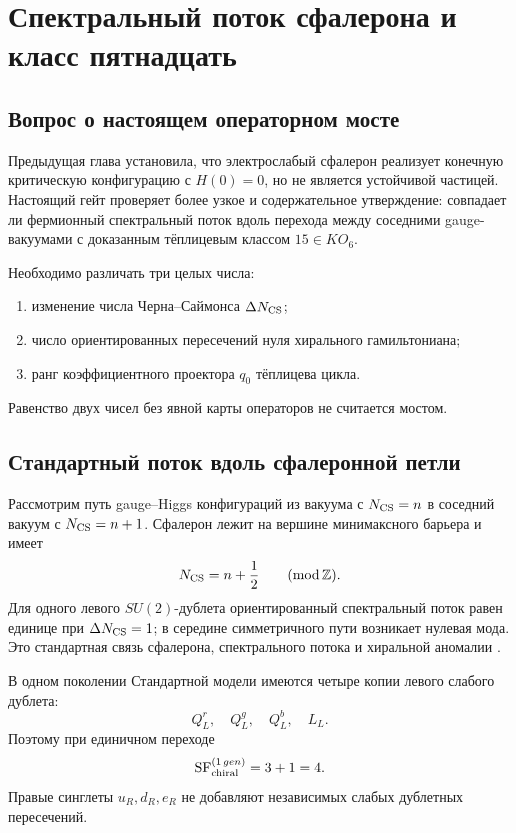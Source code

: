 \chapter{Спектральный поток сфалерона и класс пятнадцать}
\label{ch:v6-spectral-transition-sphaleron-spectral-flow-gate}

\section{Вопрос о настоящем операторном мосте}

Предыдущая глава установила, что электрослабый сфалерон реализует
конечную критическую конфигурацию с $H(0)=0$, но не является устойчивой
частицей. Настоящий гейт проверяет более узкое и содержательное
утверждение: совпадает ли фермионный спектральный поток вдоль перехода
между соседними gauge-вакуумами с доказанным тёплицевым классом
$15\in KO_6$.

Необходимо различать три целых числа:
\begin{enumerate}
 \item изменение числа Черна--Саймонса $\Delta N_{\rm CS}$;
 \item число ориентированных пересечений нуля хирального гамильтониана;
 \item ранг коэффициентного проектора $q_0$ тёплицева цикла.
\end{enumerate}
Равенство двух чисел без явной карты операторов не считается мостом.

\section{Стандартный поток вдоль сфалеронной петли}

Рассмотрим путь gauge--Higgs конфигураций из вакуума с
$N_{\rm CS}=n$ в соседний вакуум с $N_{\rm CS}=n+1$. Сфалерон лежит на
вершине минимаксного барьера и имеет
\begin{equation}
 N_{\rm CS}=n+\frac12
 \qquad (\operatorname{mod}\mathbb Z).
\end{equation}
Для одного левого $SU(2)$-дублета ориентированный спектральный поток
равен единице при $\Delta N_{\rm CS}=1$; в середине симметричного пути
возникает нулевая мода. Это стандартная связь сфалерона, спектрального
потока и хиральной аномалии
\cite{sphaleron-flow-klinkhamer-rupp2003,
sphaleron-flow-klinkhamer-lee2001}.

В одном поколении Стандартной модели имеются четыре копии левого
слабого дублета:
\begin{equation}
 Q_L^r,\quad Q_L^g,\quad Q_L^b,\quad L_L.
\end{equation}
Поэтому при единичном переходе
\begin{equation}
 \operatorname{SF}_{\rm chiral}^{(1\,gen)}=3+1=4.
 \label{eq:v6-sphaleron-flow-four}
\end{equation}
Правые синглеты $u_R,d_R,e_R$ не добавляют независимых слабых
дублетных пересечений.

